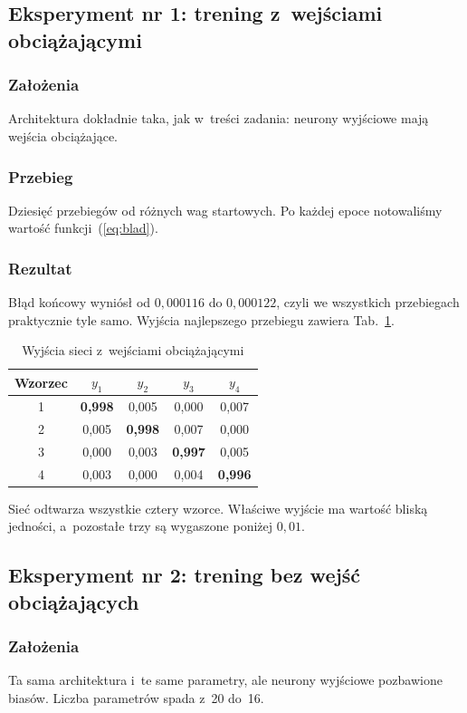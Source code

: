 \documentclass[12pt]{article}
\begin{document}
\subsection{Eksperyment nr 1: trening z~wejściami obciążającymi}

\subsubsection{Założenia}
Architektura dokładnie taka, jak w~treści zadania: neurony wyjściowe mają
wejścia obciążające.

\subsubsection{Przebieg}
Dziesięć przebiegów od różnych wag startowych. Po każdej epoce notowaliśmy
wartość funkcji~(\ref{eq:blad}).

\subsubsection{Rezultat}
Błąd końcowy wyniósł od $0{,}000116$ do $0{,}000122$, czyli we wszystkich
przebiegach praktycznie tyle samo. Wyjścia najlepszego przebiegu zawiera
Tab.~\ref{tab:zbias}.

\begin{table}[h]
\centering
\caption{Wyjścia sieci z~wejściami obciążającymi}
\label{tab:zbias}
\begin{tabular}{ccccc}
\toprule
\textbf{Wzorzec} & $y_1$ & $y_2$ & $y_3$ & $y_4$ \\
\midrule
1 & \textbf{0,998} & 0,005 & 0,000 & 0,007 \\
2 & 0,005 & \textbf{0,998} & 0,007 & 0,000 \\
3 & 0,000 & 0,003 & \textbf{0,997} & 0,005 \\
4 & 0,003 & 0,000 & 0,004 & \textbf{0,996} \\
\bottomrule
\end{tabular}
\end{table}

Sieć odtwarza wszystkie cztery wzorce. Właściwe wyjście ma wartość bliską
jedności, a~pozostałe trzy są wygaszone poniżej $0{,}01$.

\subsection{Eksperyment nr 2: trening bez wejść obciążających}

\subsubsection{Założenia}
Ta sama architektura i~te same parametry, ale neurony wyjściowe pozbawione
biasów. Liczba parametrów spada z~20 do~16.
\end{document}
